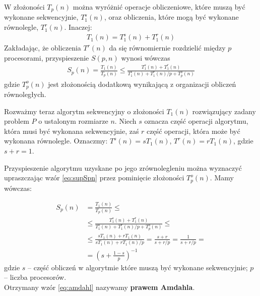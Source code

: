 W złożoności \(T_{p}(n)\) można wyróżnić operacje obliczeniowe, które muszą być wykonane sekwencyjnie, \(T^{s}_{1}(n)\), oraz obliczenia, które mogą być wykonane równolegle, \(T^{r}_{1}(n)\). Inaczej:
\begin{align}
T_{1}(n) = T^{s}_{1}(n) + T^{r}_{1}(n)
\end{align}
Zakładając, że obliczenia \(T^{r}(n)\) da się równomiernie rozdzielić między \(p\) procesorami, przyspieszenie \(S(p, n)\) wynosi wówczas
\begin{align}\label{eq:supSpn}
S_{p}(n) = \frac{T_{1}(n)}{T_{p}(n)}\leq\frac{T^{s}_{1}(n) + T^{r}_{1}(n)}{T^{s}_{1}(n) + T^{r}_{1}(n)/p + T^{o}_{p}(n)}
\end{align}
gdzie \(T^{o}_{p}(n)\) jest złożonością dodatkową wynikającą z organizacji obliczeń równoległych.


Rozważmy teraz algorytm sekwencyjny o złożoności \(T_{1}(n)\) rozwiązujący zadany problem \(P\) o ustalonym rozmiarze \(n\). Niech \(s\) oznacza część operacji algorytmu, która musi być wykonana sekwencyjnie, zaś \(r\) część operacji, która może być wykonana równolegle. Oznaczmy: \(T^{s}(n) = sT_{1}(n)\), \(T^{r}(n)=rT_{1}(n)\), gdzie \(s+r=1\). 


Przyspieszenie algorytmu uzyskane po jego zrównolegleniu można wyznaczyć upraszczając wzór \eqref{eq:supSpn} przez pominięcie złożoności \(T^{o}_{p}(n)\). Mamy wówczas:

\begin{equation}
\begin{split}\label{eq:amdahl}
S_{p}(n) &= \frac{T_{1}(n)}{T_{p}(n)}\leq\\
&\leq \frac{T^{s}_{1}(n) + T^{r}_{1}(n)}{T^{s}_{1}(n) + T^{r}_{1}(n)/p + T^{o}_{p}(n)}\leq\\
&\leq \frac{sT_{1}(n) + rT_{1}(n)}{sT_{1}(n) + rT_{1}(n)/p} = \frac{s+r}{s+r/p} = \frac{1}{s+r/p}= \\
&= \left(s+\frac{1-s}{p}\right)^{-1}
\end{split}
\end{equation}
gdzie \(s\) – część obliczeń w algorytmie które muszą być wykonane sekwencyjnie; \(p\) – liczba procesorów.\\
Otrzymany wzór \eqref{eq:amdahl} nazywamy \textbf{prawem Amdahla}. 

